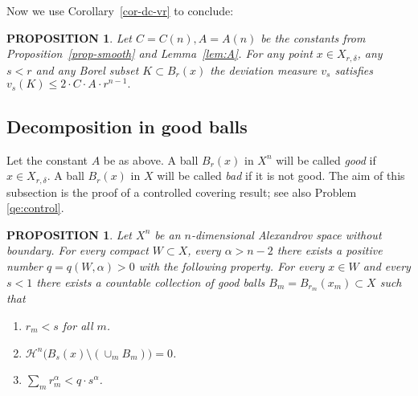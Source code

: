 \documentclass[12pt,leqno,intlimits]{amsart}
\numberwithin{equation}{section}
\newtheorem{prop}[thm]{PROPOSITION}
\theoremstyle{definition}
\theoremstyle{remark}
\newcommand{\cref}[1]{Corollary~\ref{#1}}
\newcommand{\pref}[1]{Proposition~\ref{#1}}
\newcommand{\lref}[1]{Lemma~\ref{#1}}
\def\RR{\mathbb R}
\def\eps{\varepsilon}
\begin{document}

Now we use \cref{cor-dc-vr} to conclude:


 \begin{prop}  \label{ballmeasure}
Let $C=C(n),A=A(n)$ be the constants from \pref{prop-smooth} and \lref{lem:A}.
For any point $x\in X_{r,\delta}$, any $s<r$ and any
 Borel subset $K\subset B_r (x)$ the deviation measure $v_s $ satisfies
  $v_s (K)  \leq 2\cdot C\cdot A \cdot r^{n-1}.$
 \end{prop}





\subsection{Decomposition in good balls}
Let the constant  $A$ be as above.
A ball $B_r(x)$ in $X^n$ will be called \emph{good} if $x\in X_{r,\delta}$.
%
A ball $B_r(x)$ in $X$ will be called \emph{bad} if it is not good.
The aim of this subsection is the proof of a controlled covering result; see also  Problem \ref{qe:control}.




\begin{prop}\label{prop:covering}
Let $X^n$ be an $n$-dimensional Alexandrov space without boundary.  For every compact $W\subset X$, every $\alpha >n-2$   there exists
a positive number $  q =q(W,\alpha )  >0$ with the following property. For every $x\in W$ and every $s<1 $
 there exists a countable collection of good balls $B_m=B_{r_m}(x_m) \subset X$
such that
\begin{enumerate}
\item $r_m<s$ for all $m$.
\item $ \mathcal H^n \big(B_s (x) \setminus   (\cup _m B_m )\big)=0$.
\item  $\sum_m r_m^{\alpha}< q \cdot s^{\alpha}$.
\end{enumerate}
\end{prop}
\end{document}
